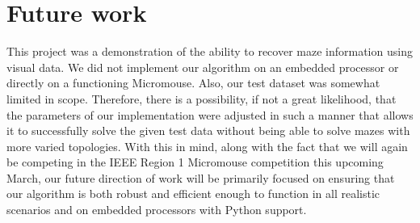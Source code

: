 \documentclass[10pt,twocolumn,letterpaper]{article}
\begin{document}
\section{Future work}
\label{sec:futurework}

This project was a demonstration of the ability to recover maze information using visual data.  We did not implement our
algorithm on an embedded processor or directly on a functioning Micromouse.  Also, our test dataset was somewhat limited
in scope.  Therefore, there is a possibility, if not a great likelihood, that the parameters of our implementation were
adjusted in such a manner that allows it to successfully solve the given test data without being able to solve mazes
with more varied topologies.  With this in mind, along with the fact that we will again be competing in the IEEE Region
1 Micromouse competition this upcoming March, our future direction of work will be primarily focused on ensuring that
our algorithm is both robust and efficient enough to function in all realistic scenarios and on embedded processors with
Python support.

{\small


}
\end{document}

